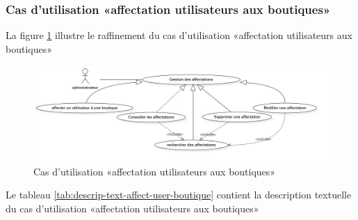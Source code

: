 \subsubsection{Cas d’utilisation «affectation  utilisateurs aux boutiques»}
La figure \ref{fig:usecase-affectation} illustre le raffinement du cas d’utilisation «affectation utilisateurs aux boutiques»
\begin{figure}[H]
	\centering
	\includegraphics[width=1\linewidth]{"img/conception/usecases/sprint 2/UseCase-affectation"}
	\caption[Cas d’utilisation «affectation utilisateurs aux boutiques»]{Cas d’utilisation «affectation utilisateurs aux boutiques»}
	\label{fig:usecase-affectation}
\end{figure}
Le tableau \ref{tab:descrip-text-affect-user-boutique} contient la description textuelle du cas d’utilisation «affectation utilisateurs aux boutiques»
